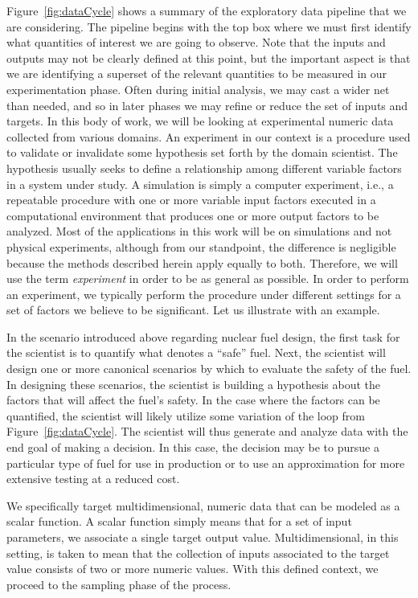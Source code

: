 Figure~\ref{fig:dataCycle} shows a summary of the exploratory data pipeline that we are considering.
%
The pipeline begins with the top box where we must first identify what quantities of interest we are going to observe.
%
Note that the inputs and outputs may not be clearly defined at this point, but the important aspect is that we are identifying a superset of the relevant quantities to be measured in our experimentation phase.
%
Often during initial analysis, we may cast a wider net than needed, and so in later phases we may refine or reduce the set of inputs and targets.
%
In this body of work, we will be looking at experimental numeric data collected from various domains.
%
An experiment in our context is a procedure used to validate or invalidate some hypothesis set forth by the domain scientist.
%
The hypothesis usually seeks to define a relationship among different variable factors in a system under study.
%
A simulation is simply a computer experiment, i.e., a repeatable procedure with one or more variable input factors executed in a computational environment that produces one or more output factors to be analyzed.
%
Most of the applications in this work will be on simulations and not physical experiments, although from our standpoint, the difference is negligible because the methods described herein apply equally to both.
%
Therefore, we will use the term \textit{experiment} in order to be as general as possible.
%
In order to perform an experiment, we typically perform the procedure under different settings for a set of factors we believe to be significant.
%
Let us illustrate with an example.

In the scenario introduced above regarding nuclear fuel design, the first task for the scientist is to quantify what denotes a ``safe'' fuel.
%
Next, the scientist will design one or more canonical scenarios by which to evaluate the safety of the fuel.
%
In designing these scenarios, the scientist is building a hypothesis about the factors that will affect the fuel's safety.
%
In the case where the factors can be quantified, the scientist will likely utilize some variation of the loop from Figure~\ref{fig:dataCycle}.
%
The scientist will thus generate and analyze data with the end goal of making a decision.
%
In this case, the decision may be to pursue a particular type of fuel for use in production or to use an approximation for more extensive testing at a reduced cost.

We specifically target multidimensional, numeric data that can be modeled as a scalar function.
%
A scalar function simply means that for a set of input parameters, we associate a single target output value.
%
Multidimensional, in this setting, is taken to mean that the collection of inputs associated to the target value consists of two or more numeric values.
%
With this defined context, we proceed to the sampling phase of the process.

